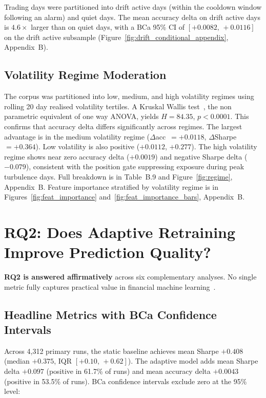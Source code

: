 Trading days were partitioned into drift active days (within the cooldown window following an alarm) and quiet days. The mean accuracy delta on drift active days is $4.6\times$ larger than on quiet days, with a BCa 95\% CI of $[{+}0.0082,\, {+}0.0116]$ on the drift active subsample (Figure~\ref{fig:drift_conditional_appendix}, Appendix~B).

\subsection{Volatility Regime Moderation}
\label{subsec:regime}

The corpus was partitioned into low, medium, and high volatility regimes using rolling 20 day realised volatility tertiles. A Kruskal Wallis test~\cite{kruskal1952}, the non parametric equivalent of one way ANOVA, yields $H{=}84.35$, $p{<}0.0001$. This confirms that accuracy delta differs significantly across regimes. The largest advantage is in the medium volatility regime ($\Delta$acc~$= +0.0118$, $\Delta$Sharpe~$= +0.364$). Low volatility is also positive ($+0.0112$, $+0.277$). The high volatility regime shows near zero accuracy delta ($+0.0019$) and negative Sharpe delta ($-0.079$), consistent with the position gate suppressing exposure during peak turbulence days. Full breakdown is in Table~B.9 and Figure~\ref{fig:regime}, Appendix~B. Feature importance stratified by volatility regime is in Figures~\ref{fig:feat_importance} and~\ref{fig:feat_importance_bars}, Appendix~B.

\section{RQ2: Does Adaptive Retraining Improve Prediction Quality?}
\label{sec:rq2}

\textbf{RQ2 is answered affirmatively} across six complementary analyses. No single metric fully captures practical value in financial machine learning~\cite{grinold2000,gu2020}.

\subsection{Headline Metrics with BCa Confidence Intervals}
\label{subsec:headline}

Across 4,312 primary runs, the static baseline achieves mean Sharpe $+0.408$ (median $+0.375$, IQR $[{+}0.10,\,{+}0.62]$). The adaptive model adds mean Sharpe delta $+0.097$ (positive in 61.7\% of runs) and mean accuracy delta $+0.0043$ (positive in 53.5\% of runs). BCa confidence intervals exclude zero at the 95\% level:

